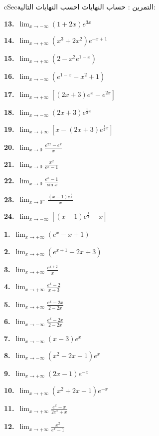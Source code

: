 \documentclass[12pt,a4paper]{article}
\newenvironment{BOX}[2]{\begin{otherlanguage}{english}\begin{arbox}{#1}{#2}}{\end{arbox}\end{otherlanguage}}
\newcounter{exo}
\newenvironment{tamrin}[1]{\stepcounter{exo}\begin{BOX}{cSec}{التمرين \theexo: #1}}{\end{BOX}}
\newenvironment{LTR}{\begin{otherlanguage}{english}}{\end{otherlanguage}}
\newcommand{\TwoCol}[4]{\par\begin{LTR}\noindent\begin{minipage}[t]{#1\textwidth}\selectlanguage{arabic}#2\end{minipage}\hfill\begin{minipage}[t]{#3\textwidth}\selectlanguage{arabic}#4\end{minipage}\end{LTR}\par}
\newcommand{\RL}[4]{\TwoCol{#3}{#4}{#1}{#2}}  %
\begin{document}
\begin{tamrin}{حساب النهايات}
احسب النهايات التالية:
\RL{0.48}{%
\textbf{1.}\ $\displaystyle\lim_{x\to+\infty}\left(e^{x}-x+1\right)$\par\smallskip
\textbf{2.}\ $\displaystyle\lim_{x\to+\infty}\left(e^{x+1}-2x+3\right)$\par\smallskip
\textbf{3.}\ $\displaystyle\lim_{x\to+\infty}\frac{e^{x+2}}{x}$\par\smallskip
\textbf{4.}\ $\displaystyle\lim_{x\to+\infty}\frac{e^{x}-2}{x+3}$\par\smallskip
\textbf{5.}\ $\displaystyle\lim_{x\to+\infty}\frac{e^{x}-2x}{2-2x}$\par\smallskip
\textbf{6.}\ $\displaystyle\lim_{x\to-\infty}\frac{e^{x}-2x}{2-2x}$\par\smallskip
\textbf{7.}\ $\displaystyle\lim_{x\to-\infty}(x-3)e^{x}$\par\smallskip
\textbf{8.}\ $\displaystyle\lim_{x\to-\infty}\left(x^{2}-2x+1\right)e^{x}$\par\smallskip
\textbf{9.}\ $\displaystyle\lim_{x\to+\infty}(2x-1)e^{-x}$\par\smallskip
\textbf{10.}\ $\displaystyle\lim_{x\to+\infty}\left(x^{2}+2x-1\right)e^{-x}$\par\smallskip
\textbf{11.}\ $\displaystyle\lim_{x\to+\infty}\frac{e^{x}-x}{2e^{x}+x}$\par\smallskip
\textbf{12.}\ $\displaystyle\lim_{x\to+\infty}\frac{x^{2}}{e^{x}-1}$\par\smallskip
}{0.48}{%
\textbf{13.}\ $\displaystyle\lim_{x\to-\infty}(1+2x)e^{3x}$\par\smallskip
\textbf{14.}\ $\displaystyle\lim_{x\to+\infty}\left(x^{3}+2x^{2}\right)e^{-x+1}$\par\smallskip
\textbf{15.}\ $\displaystyle\lim_{x\to+\infty}\left(2-x^{2}e^{1-x}\right)$\par\smallskip
\textbf{16.}\ $\displaystyle\lim_{x\to-\infty}\left(e^{1-x}-x^{2}+1\right)$\par\smallskip
\textbf{17.}\ $\displaystyle\lim_{x\to+\infty}\left[(2x+3)e^{x}-e^{2x}\right]$\par\smallskip
\textbf{18.}\ $\displaystyle\lim_{x\to-\infty}(2x+3)e^{\frac12x}$\par\smallskip
\textbf{19.}\ $\displaystyle\lim_{x\to+\infty}\left[x-(2x+3)e^{\frac12x}\right]$\par\smallskip
\textbf{20.}\ $\displaystyle\lim_{x\to0}\frac{e^{2x}-e^{x}}{x}$\par\smallskip
\textbf{21.}\ $\displaystyle\lim_{x\to0}\frac{x^{2}}{e^{x}-1}$\par\smallskip
\textbf{22.}\ $\displaystyle\lim_{x\to0}\frac{e^{x}-1}{\sin x}$\par\smallskip
\textbf{23.}\ $\displaystyle\lim_{x\to0^{-}}\frac{(x-1)e^{\frac1x}}{x}$\par\smallskip
\textbf{24.}\ $\displaystyle\lim_{x\to-\infty}\left[(x-1)e^{\frac1x}-x\right]$\par\smallskip
}
\end{tamrin}
\end{document}
